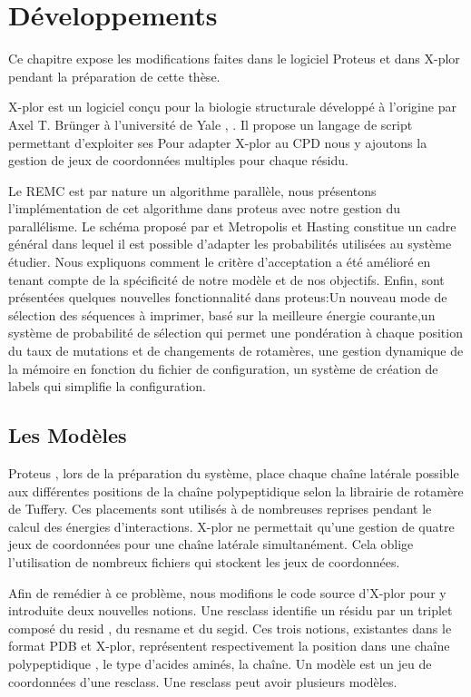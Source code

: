 \chapter{Développements}
\label{chap:developpements}

Ce chapitre expose les modifications faites dans le logiciel Proteus et dans X-plor pendant la préparation de cette thèse.

X-plor est un logiciel conçu pour la biologie structurale développé à l'origine par Axel T. Brünger à l'université de Yale , \cite{Brünger92}. Il propose un langage de script permettant d'exploiter ses Pour adapter X-plor au CPD nous y ajoutons la gestion de jeux de coordonnées multiples pour chaque résidu.

Le REMC est par nature un algorithme parallèle, nous présentons l'implémentation de cet algorithme dans proteus avec notre gestion du parallélisme. Le schéma proposé par et Metropolis et Hasting constitue un cadre général dans lequel il est possible d'adapter les probabilités utilisées au système étudier. Nous expliquons comment le critère d'acceptation a été amélioré en tenant compte de la spécificité de notre modèle et de nos objectifs. Enfin, sont présentées quelques nouvelles fonctionnalité dans proteus:Un nouveau mode de sélection des séquences à imprimer, basé sur la meilleure énergie courante,un système de probabilité de sélection qui permet une pondération à chaque position du taux de mutations et de changements de rotamères, une gestion dynamique de la mémoire en fonction du fichier de configuration, un système de création de labels qui simplifie la configuration.  


\section{Les Modèles }

Proteus , lors de la préparation du système, place chaque chaîne latérale possible aux différentes positions de la chaîne polypeptidique selon la librairie de rotamère de Tuffery. Ces placements sont utilisés à de nombreuses reprises pendant le calcul des énergies d'interactions. X-plor ne permettait qu'une gestion de quatre jeux de coordonnées pour une chaîne latérale simultanément. Cela oblige l'utilisation de nombreux fichiers qui stockent les jeux de coordonnées.

Afin de remédier à ce problème, nous modifions le code source d'X-plor pour y introduite deux nouvelles notions. Une resclass identifie un résidu par un triplet composé du resid , du resname et du segid. Ces trois notions, existantes dans le format PDB et X-plor, représentent respectivement la position dans une chaîne polypeptidique , le type d'acides aminés, la chaîne. Un modèle est un jeu de coordonnées d'une resclass. Une resclass peut avoir plusieurs modèles.


